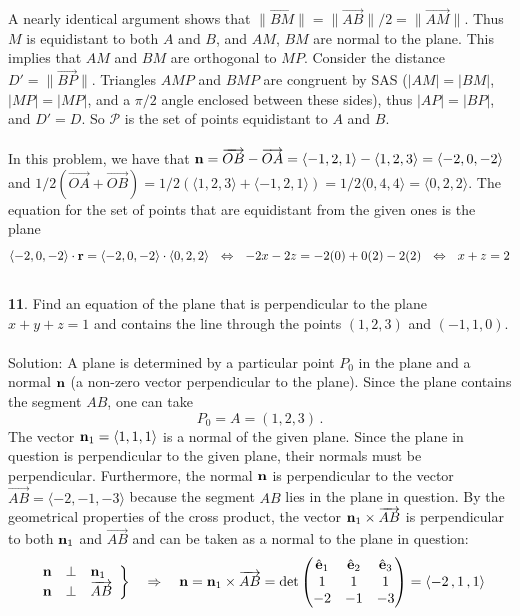 \documentclass[12pt]{amsbook}
\newcommand{\la}{\langle}
\newcommand{\ra}{\rangle}
\begin{document}
A nearly identical argument shows that $\|\overrightarrow{BM}\|=\|\overrightarrow{AB}\|/2=\|\overrightarrow{AM}\|$. Thus $M$ is equidistant to both $A$ and $B$, and $AM$, $BM$ are normal to the plane. This implies that $AM$ and $BM$ are orthogonal to $MP$. Consider the distance $D'=\|\overrightarrow{BP}\|$. Triangles $AMP$ and $BMP$ are congruent by SAS ($|AM|=|BM|$, $|MP|=|MP|$, and a $\pi/2$ angle enclosed between these sides), thus $|AP|=|BP|$, and $D'=D$. So $\mathcal{P}$ is the set of points equidistant to $A$ and $B$.
\\
\\
In this problem, we have that ${\bf n}=\overrightarrow{OB}-\overrightarrow{OA}=\la -1,2,1 \ra - \la 1,2,3\ra = \la -2, 0, -2 \ra$ and $1/2(\overrightarrow{OA}+\overrightarrow{OB})=1/2(\la 1,2,3 \ra + \la -1,2,1 \ra)=1/2\la 0,4,4 \ra = \la 0,2,2 \ra$. The equation for the set of points that are equidistant from the given ones is the plane
$$\la -2, 0, -2 \ra \cdot {\bf r}=\la -2, 0, -2 \ra\cdot \la 0,2,2 \ra \ \ \Leftrightarrow \ \ -2x-2z=-2(0)+0(2)-2(2) \ \ \Leftrightarrow \ \ x+z=2$$
\\
{\small\bf 11}. Find an equation of the plane that is perpendicular to
the plane $x+y+z=1$ and contains the line through the points
$(1,2,3)$ and $(-1,1,0)$.\\
\\
{\sc Solution}: A plane is determined by a particular point $P_0$ in the plane 
and a normal ${\bf n}$ (a non-zero vector perpendicular to the plane). Since 
the plane contains the segment $AB$, one can take 
$$
P_0=A = (1,2,3)\,.
$$
The vector ${\bf n}_1=\la 1,1,1\ra$ is a normal of the given plane. 
Since the plane in question is perpendicular to the given plane, their 
normals must be perpendicular. Furthermore, the normal ${\bf n}$ is 
perpendicular to the vector $\overrightarrow{AB}=\la -2,-1,-3\ra$ because
the segment $AB$ lies in the plane in question. By the geometrical 
properties of the cross product, the vector 
${\bf n}_1\times \overrightarrow{AB}$ is perpendicular to both 
${\bf n}_1$ and $\overrightarrow{AB}$ and can be taken as a normal to the 
plane in question:
\begin{eqnarray*}
\left.\begin{array}{rcl}
 {\bf n}&\perp& {\bf n}_1\\
{\bf n}&\perp&\overrightarrow{AB}
\end{array}\right\}\quad\Rightarrow\quad
{\bf n}={\bf n}_1\times\overrightarrow{AB}=
\det\begin{pmatrix}\hat{\bf e}_1&\hat{\bf e}_2&
\hat{\bf e}_3\cr  1&1&1\cr -2&-1&-3\end{pmatrix}=\la-2\,,1\,,1\ra
\end{eqnarray*}
\end{document}
